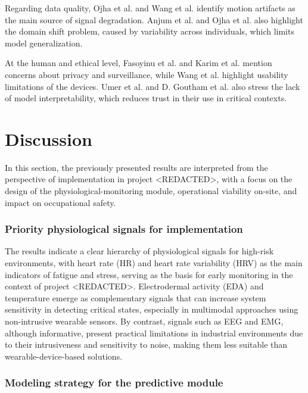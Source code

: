 \documentclass[runningheads]{llncs}
\begin{document}
Regarding data quality, Ojha et al. and Wang et al.\cite{ojha2024,wang2024} identify motion artifacts as the main source of signal degradation. Anjum et al. and Ojha et al.\cite{anjum2025,ojha2024} also highlight the domain shift problem, caused by variability across individuals, which limits model generalization.

At the human and ethical level, Fasoyinu et al. and Karim et al.\cite{fasoyinu2025,karim2025} mention concerns about privacy and surveillance, while Wang et al.\cite{wang2024} highlight usability limitations of the devices. Umer et al. and D. Goutham et al.\cite{umer2025,goutham2025} also stress the lack of model interpretability, which reduces trust in their use in critical contexts.

\section{Discussion}

In this section, the previously presented results are interpreted from the perspective of implementation in project <REDACTED>, with a focus on the design of the physiological-monitoring module, operational viability on-site, and impact on occupational safety.

\subsubsection*{Priority physiological signals for implementation}

The results indicate a clear hierarchy of physiological signals for high-risk environments, with heart rate (HR) and heart rate variability (HRV) as the main indicators of fatigue and stress, serving as the basis for early monitoring in the context of project <REDACTED>. Electrodermal activity (EDA) and temperature emerge as complementary signals that can increase system sensitivity in detecting critical states, especially in multimodal approaches using non-intrusive wearable sensors. By contrast, signals such as EEG and EMG, although informative, present practical limitations in industrial environments due to their intrusiveness and sensitivity to noise, making them less suitable than wearable-device-based solutions.

\subsubsection*{Modeling strategy for the predictive module}
\end{document}
